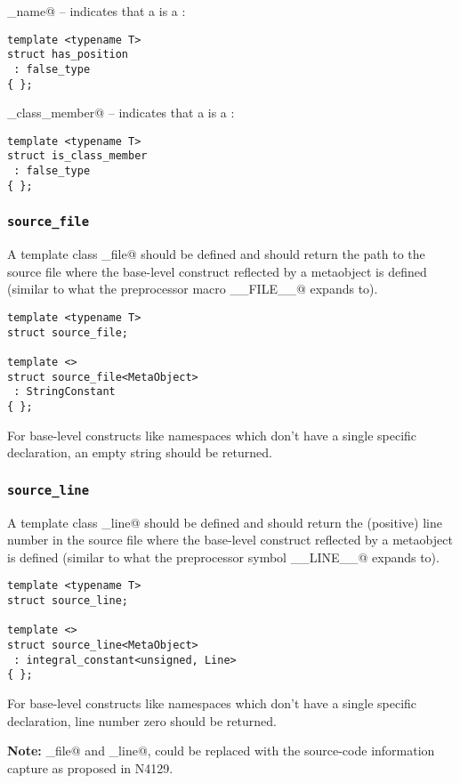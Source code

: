 \verb@has_name@ -- indicates that a  is a :
\begin{verbatim}
template <typename T>
struct has_position
 : false_type
{ };
\end{verbatim}

\verb@is_class_member@ -- indicates that a  is a :
\begin{verbatim}
template <typename T>
struct is_class_member
 : false_type
{ };
\end{verbatim}

\subsubsection{\texttt{source\_file}}

A template class \verb@source_file@ should be defined and should return the
path to the source file where the base-level construct reflected by a
metaobject is defined (similar to what the preprocessor macro \verb@__FILE__@
expands to).

\begin{verbatim}
template <typename T>
struct source_file;

template <>
struct source_file<MetaObject>
 : StringConstant
{ };
\end{verbatim}

For base-level constructs like namespaces which don't have a single specific
declaration, an empty string should be returned.

\subsubsection{\texttt{source\_line}}

A template class \verb@source_line@ should be defined and should return the (positive)
line number in the source file where the base-level construct reflected by a
metaobject is defined (similar to what the preprocessor symbol \verb@__LINE__@
expands to).

\begin{verbatim}
template <typename T>
struct source_line;

template <>
struct source_line<MetaObject>
 : integral_constant<unsigned, Line>
{ };
\end{verbatim}

For base-level constructs like namespaces which don't have a single specific
declaration, line number zero should be returned.

\textbf{Note:} \verb@source_file@ and \verb@source_line@, could be
replaced with the source-code information capture as proposed in N4129.

